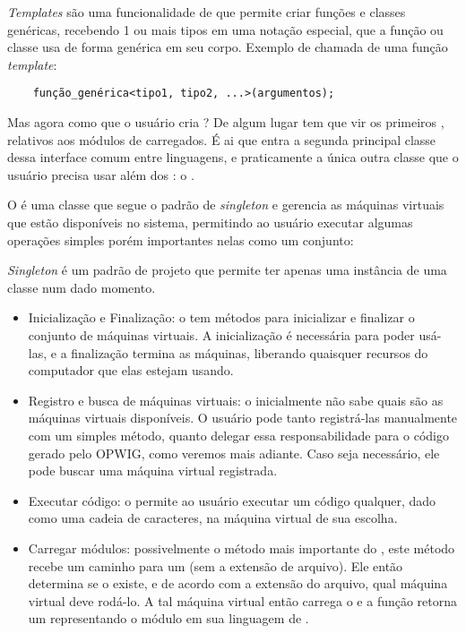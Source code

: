   \begin{framed}
    \textit{Templates} são uma funcionalidade de \CXX{} que permite
    criar funções e classes genéricas, recebendo 1 ou mais tipos\footnotemark{} em uma notação especial,
    que a função ou classe usa de forma genérica em seu corpo. Exemplo de chamada de uma
    função \textit{template}:
  \begin{verbatim}
    função_genérica<tipo1, tipo2, ...>(argumentos);\end{verbatim}
  \end{framed}
  
  
  Mas agora como que o usuário cria ? De algum lugar tem que vir os primeiros , relativos
  aos módulos de \script{} carregados. É ai que entra a segunda principal classe dessa interface comum
  entre linguagens, e praticamente a única outra classe que o usuário precisa usar além dos :
  o \SMgr{}.
  
  O \SMgr{} é uma classe que segue o padrão de \textit{singleton} e gerencia as máquinas virtuais que
  estão disponíveis no sistema, permitindo ao usuário executar algumas operações simples porém 
  importantes nelas como um conjunto:
  
  \begin{framed}
    \textit{Singleton} é um padrão de projeto que permite ter apenas uma instância de uma classe
    num dado momento.
  \end{framed}
  
  \begin{itemize}
    \item Inicialização e Finalização: o \SMgr{} tem métodos para inicializar e finalizar o conjunto
      de máquinas virtuais. A inicialização é necessária para poder usá-las, e a finalização 
      termina as máquinas, liberando quaisquer recursos do computador que elas estejam usando.
    \item Registro e busca de máquinas virtuais: o \SMgr{} inicialmente não sabe quais são as máquinas
      virtuais disponíveis. O usuário pode tanto registrá-las manualmente com um simples método, quanto
      delegar essa responsabilidade para o código gerado pelo OPWIG, como veremos mais adiante.
      Caso seja necessário, ele pode buscar uma máquina virtual registrada.
    \item Executar código: o \SMgr{} permite ao usuário executar um código qualquer, dado como uma
      cadeia de caracteres, na máquina virtual de sua escolha.
    \item Carregar módulos: possivelmente o método mais importante do \SMgr{}, este método recebe
      um caminho para um \script{} (sem a extensão de arquivo). Ele então determina se o \script{}
      existe, e de acordo com a extensão do arquivo, qual máquina virtual deve rodá-lo. A tal máquina
      virtual então carrega o \script{} e a função retorna um \VObj{} representando o módulo em
      sua linguagem de \script{}.
  \end{itemize}
  
